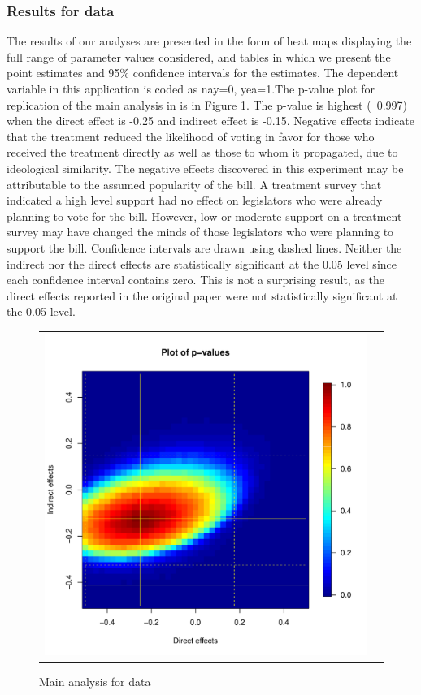 \documentclass[12pt]{article}
\begin{document}
\subsubsection{Results for \citet{butler2011can} data}

The results of our analyses are presented in the form of heat maps displaying the full range of parameter values considered, and tables in which we present the point estimates and 95\% confidence intervals for the estimates. The dependent variable in this application is coded as nay=0, yea=1.The p-value plot for replication of the main analysis in \citet{coppock2014information} is in Figure 1. The p-value is highest (~0.997) when the direct effect is -0.25 and indirect effect is -0.15. Negative effects indicate that the treatment reduced the likelihood of voting in favor for those who received the treatment directly as well as those to whom it propagated, due to ideological similarity. The negative effects discovered in this experiment may be attributable to the assumed popularity of the bill. A treatment survey that indicated a high level support had no effect on legislators who were already planning to vote for the bill. However, low or moderate support on a treatment survey may have changed the minds of those legislators who were planning to support the bill. Confidence intervals are drawn using dashed lines. Neither the indirect nor the direct effects are statistically significant at the 0.05 level since each confidence interval contains zero. This is not a surprising result, as the direct effects reported in the original paper were not statistically significant at the 0.05 level.

\begin{figure}
	\centering
	\begin{tabular}{cc}
	\includegraphics[scale=0.45]{./images/pval_plot_coppock_replication.pdf}
	\end{tabular}
	\caption{Main analysis for \citet{butler2011can} data}
\end{figure}
\end{document}
